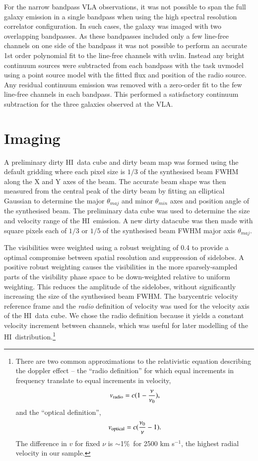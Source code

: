 \documentclass[traditabstract]{aa} %
\newcommand\HI{H{\small I}}
\newcommand\kms{km s$^{-1}$}
\begin{document}
\begin{appendix}
For the narrow bandpass VLA observations, it was not
possible to span the full galaxy emission in a single bandpass when
using the high spectral resolution correlator configuration. In such
cases, the galaxy was imaged with two overlapping bandpasses. As these
bandpasses included only a few line-free channels on one side of the
bandpass it was not possible to perform an accurate 1st order
polynomial fit to the line-free channels with {\sc uvlin}. Instead any
bright continuum sources were subtracted from each bandpass with the
task {\sc uvmodel} using a point source model with the fitted
flux and position of the radio source. Any residual continuum emission
was removed with a zero-order fit to the few line-free channels in
each bandpass. This performed a satisfactory continuum subtraction for
the three galaxies observed at the VLA.

\section{Imaging}
\label{sec:imaging-HI}

A preliminary dirty \HI\ data cube and dirty beam map was formed
using the default gridding where each pixel size is $1/3$
of the synthesised beam FWHM along the X
and Y axes of the beam. The accurate beam shape was then measured from
the central peak of the dirty beam by fitting an elliptical Gaussian
to determine the major $\theta_{maj}$ and minor $\theta_{min}$ axes
and position angle of the synthesised beam. The preliminary data cube
was used to determine the size and velocity range of the \HI\ emission.
A new dirty datacube was then made with square pixels each of $1/3$ or
$1/5$ of the synthesised beam FWHM major axis $\theta_{maj}$.

The visibilities were weighted using a robust weighting of 0.4
\citep{briggs1995} to
provide a optimal compromise between spatial resolution and
suppression of sidelobes. A positive robust weighting causes the
visibilities in the
more sparsely-sampled parts of the visibility phase space to be
down-weighted relative to uniform weighting. This reduces the
amplitude of the sidelobes, without significantly increasing the size
of the synthesised beam FWHM. The barycentric velocity reference frame and the
{\it  radio} definition of velocity was used for the velocity axis of the
\HI\ data cube. We chose the radio definition because
it yields a constant velocity increment between channels, which was
useful for later modelling of the \HI\ distribution.\footnote{There are two
common approximations to the relativistic equation describing the
doppler effect -- the ``radio definition'' for which equal increments
in frequency translate to equal increments in velocity,
$$
    v_{\rm radio}=c(1-\frac{\nu}{\nu_0}),
$$
  and the ``optical definition'',
$$
    v_{\rm optical}=c(\frac{\nu_0}{\nu}-1).
$$
The difference in $v$ for fixed $\nu$ is $\sim$1\%\ for 2500 \kms, the
highest radial velocity in our sample.
  }



\end{appendix}
\end{document}
